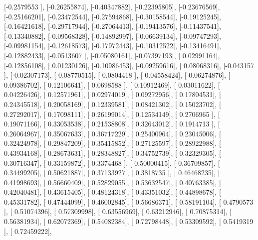 \documentclass{article}
\begin{document}
       [-0.2579553 ],
       [-0.26255874],
       [-0.40347882],
       [-0.22395805],
       [-0.23676569],
       [-0.25166201],
       [-0.23472544],
       [-0.27594868],
       [-0.30158544],
       [-0.19125245],
       [-0.16421618],
       [-0.29717944],
       [-0.27064413],
       [-0.19413576],
       [-0.11437541],
       [-0.13340882],
       [-0.09568328],
       [-0.14892997],
       [-0.06639134],
       [-0.09747293],
       [-0.09981154],
       [-0.12618573],
       [-0.17972443],
       [-0.10312522],
       [-0.13416491],
       [-0.12882433],
       [-0.0513607 ],
       [-0.05080161],
       [-0.07397193],
       [ 0.02991164],
       [-0.12856108],
       [ 0.01230126],
       [-0.10986453],
       [-0.09259616],
       [ 0.08068316],
       [-0.043157  ],
       [-0.02307173],
       [ 0.08770515],
       [ 0.0804418 ],
       [ 0.04558424],
       [ 0.06274876],
       [ 0.09386702],
       [ 0.12106641],
       [ 0.0698588 ],
       [ 0.10912469],
       [ 0.03011622],
       [ 0.04226426],
       [ 0.12571961],
       [ 0.02974019],
       [ 0.09272956],
       [ 0.17804531],
       [ 0.24345518],
       [ 0.20058169],
       [ 0.12339581],
       [ 0.08421302],
       [ 0.15023702],
       [ 0.27292017],
       [ 0.17098111],
       [ 0.26199014],
       [ 0.12534149],
       [ 0.2706965 ],
       [ 0.19071166],
       [ 0.33053538],
       [ 0.21538808],
       [ 0.32643012],
       [ 0.1914713 ],
       [ 0.26064967],
       [ 0.35067633],
       [ 0.36717229],
       [ 0.25400964],
       [ 0.23045006],
       [ 0.32424978],
       [ 0.29847209],
       [ 0.35415852],
       [ 0.27125597],
       [ 0.28922988],
       [ 0.43934168],
       [ 0.28673631],
       [ 0.28348827],
       [ 0.34752739],
       [ 0.32329305],
       [ 0.30716347],
       [ 0.33159872],
       [ 0.3374468 ],
       [ 0.50000415],
       [ 0.36709857],
       [ 0.34499205],
       [ 0.50621887],
       [ 0.37133927],
       [ 0.3818735 ],
       [ 0.46468235],
       [ 0.41998693],
       [ 0.56660409],
       [ 0.52829055],
       [ 0.53632547],
       [ 0.40763385],
       [ 0.42040481],
       [ 0.43615405],
       [ 0.48124318],
       [ 0.43351032],
       [ 0.44898678],
       [ 0.45331782],
       [ 0.47444099],
       [ 0.46002845],
       [ 0.56686371],
       [ 0.58191104],
       [ 0.4790573 ],
       [ 0.51074396],
       [ 0.57309998],
       [ 0.63556969],
       [ 0.63212946],
       [ 0.70875314],
       [ 0.56381934],
       [ 0.62072369],
       [ 0.54082384],
       [ 0.72798448],
       [ 0.53309592],
       [ 0.5419319 ],
       [ 0.72459222],
\end{document}
